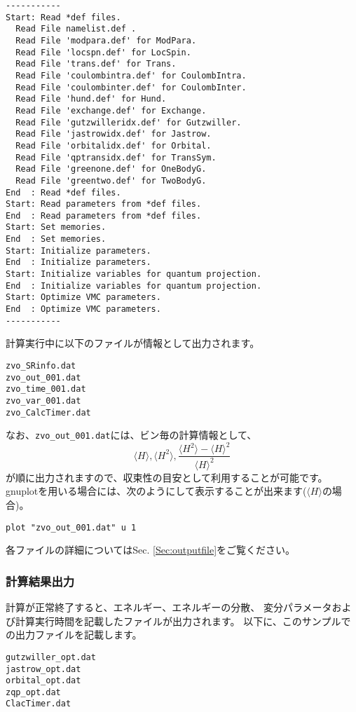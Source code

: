 \begin{verbatim}
-----------
Start: Read *def files.
  Read File namelist.def .
  Read File 'modpara.def' for ModPara.
  Read File 'locspn.def' for LocSpin.
  Read File 'trans.def' for Trans.
  Read File 'coulombintra.def' for CoulombIntra.
  Read File 'coulombinter.def' for CoulombInter.
  Read File 'hund.def' for Hund.
  Read File 'exchange.def' for Exchange.
  Read File 'gutzwilleridx.def' for Gutzwiller.
  Read File 'jastrowidx.def' for Jastrow.
  Read File 'orbitalidx.def' for Orbital.
  Read File 'qptransidx.def' for TransSym.
  Read File 'greenone.def' for OneBodyG.
  Read File 'greentwo.def' for TwoBodyG.
End  : Read *def files.
Start: Read parameters from *def files.
End  : Read parameters from *def files.
Start: Set memories.
End  : Set memories.
Start: Initialize parameters.
End  : Initialize parameters.
Start: Initialize variables for quantum projection.
End  : Initialize variables for quantum projection.
Start: Optimize VMC parameters.
End  : Optimize VMC parameters.
-----------
\end{verbatim}

計算実行中に以下のファイルが情報として出力されます。
\\
\begin{minipage}{12cm}
  \begin{screen}
\begin{verbatim}
zvo_SRinfo.dat
zvo_out_001.dat
zvo_time_001.dat
zvo_var_001.dat
zvo_CalcTimer.dat
\end{verbatim}
  \end{screen}
\end{minipage}

なお、\verb|zvo_out_001.dat|には、ビン毎の計算情報として、
\begin{equation}
\langle H \rangle, \langle H^2 \rangle, \frac{\langle H^2 \rangle- \langle H \rangle^2 }{\langle H \rangle^2} \nonumber
\end{equation}
が順に出力されますので、収束性の目安として利用することが可能です。
gnuplotを用いる場合には、次のようにして表示することが出来ます($\langle H \rangle$の場合)。
\begin{verbatim}
plot "zvo_out_001.dat" u 1
\end{verbatim}
各ファイルの詳細についてはSec. \ref{Sec:outputfile}をご覧ください。\\

\subsubsection{計算結果出力}
計算が正常終了すると、エネルギー、エネルギーの分散、
変分パラメータおよび計算実行時間を記載したファイルが出力されます。
以下に、このサンプルでの出力ファイルを記載します。\\
\begin{minipage}{12cm}
\begin{screen}
\begin{verbatim}
gutzwiller_opt.dat
jastrow_opt.dat
orbital_opt.dat
zqp_opt.dat
ClacTimer.dat
\end{verbatim}
\end{screen}
\end{minipage}

